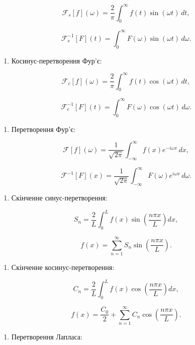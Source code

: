 \documentclass[
  ukrainian,
]{article}
\providecommand{\tightlist}{%
  \setlength{\itemsep}{0pt}\setlength{\parskip}{0pt}}
\begin{document}
\[
\mathcal{F}_s[f](\omega) = \frac{2}{\pi}\int_0^\infty f(t)\sin(\omega t)\,dt,
\]

\[
\mathcal{F}_s^{-1}[F](t) = \int_0^\infty F(\omega)\sin(\omega t)\,d\omega.
\]

\begin{enumerate}
\def\labelenumi{\arabic{enumi}.}
\setcounter{enumi}{1}
\tightlist
\item
  Косинус-перетворення Фур'є:
\end{enumerate}

\[
\mathcal{F}_c[f](\omega) = \frac{2}{\pi}\int_0^\infty f(t)\cos(\omega t)\,dt,
\]

\[
\mathcal{F}_c^{-1}[F](t) = \int_0^\infty F(\omega)\cos(\omega t)\,d\omega.
\]

\begin{enumerate}
\def\labelenumi{\arabic{enumi}.}
\setcounter{enumi}{2}
\tightlist
\item
  Перетворення Фур'є:
\end{enumerate}

\[
\mathcal{F}[f](\omega) = \frac{1}{\sqrt{2\pi}}\int_{-\infty}^{\infty} f(x)e^{-i\omega x}\,dx,
\]

\[
\mathcal{F}^{-1}[F](x) = \frac{1}{\sqrt{2\pi}}\int_{-\infty}^{\infty} F(\omega)e^{i\omega x}\,d\omega.
\]

\begin{enumerate}
\def\labelenumi{\arabic{enumi}.}
\setcounter{enumi}{3}
\tightlist
\item
  Скінченне синус-перетворення:
\end{enumerate}

\[
S_n = \frac{2}{L}\int_0^L f(x)\sin\!\left(\frac{n\pi x}{L}\right) dx,
\]

\[
f(x) = \sum_{n=1}^{\infty} S_n \sin\!\left(\frac{n\pi x}{L}\right).
\]

\begin{enumerate}
\def\labelenumi{\arabic{enumi}.}
\setcounter{enumi}{4}
\tightlist
\item
  Скінченне косинус-перетворення:
\end{enumerate}

\[
C_n = \frac{2}{L}\int_0^L f(x)\cos\!\left(\frac{n\pi x}{L}\right) dx,
\]

\[
f(x) = \frac{C_0}{2} + \sum_{n=1}^{\infty} C_n \cos\!\left(\frac{n\pi x}{L}\right).
\]

\begin{enumerate}
\def\labelenumi{\arabic{enumi}.}
\setcounter{enumi}{5}
\tightlist
\item
  Перетворення Лапласа:
\end{enumerate}
\end{document}
